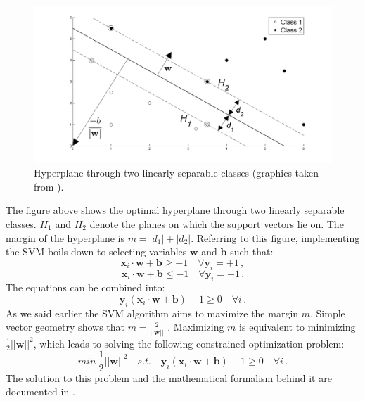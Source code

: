 \documentclass[a4paper,11pt,oneside]{article}
\begin{document}
\begin{figure}[H]
  \includegraphics[scale=0.3]{hyperplane}
  \centering
  \caption{Hyperplane through two linearly separable classes (graphics taken from \cite{fletcher2009support}).}
\end{figure}
The figure above shows the optimal hyperplane through two linearly separable classes. 
$H_1$ and $H_2$ denote the planes on which the support vectors lie on. 
The margin of the hyperplane is $m = |d_1|+|d_2|$. Referring to this figure, implementing the SVM boils down to selecting
variables $\mathbf{w}$ and $\mathbf{b}$ such that:
\begin{equation}\label{svm1}
  \mathbf{x}_i\cdot\mathbf{w}+\mathbf{b}\geq +1 \quad \forall \mathbf{y}_i = +1\,,
\end{equation}
\begin{equation}\label{svm2}
  \mathbf{x}_i\cdot\mathbf{w}+\mathbf{b}\leq -1 \quad \forall \mathbf{y}_i = -1\,.
\end{equation}
The equations can be combined into:
\begin{equation}\label{svm3}
  \mathbf{y}_i(\mathbf{x}_i\cdot\mathbf{w}+\mathbf{b}) - 1 \geq 0 \quad \forall i\,.
\end{equation}
As we said earlier the SVM algorithm aims to maximize the margin $m$. Simple vector geometry
shows that $m = \frac{2}{||\mathbf{w}||}$ \cite{fletcher2009support}. Maximizing $m$ is equivalent to minimizing
$\frac{1}{2}||\mathbf{w}||^2$, which leads to solving the following constrained optimization problem:
\begin{equation}\label{primal}
  min \ \frac{1}{2}||\mathbf{w}||^2 \quad s.t. \quad  \mathbf{y}_i(\mathbf{x}_i\cdot\mathbf{w}+\mathbf{b}) - 1 \geq 0 \quad \forall i\,.
\end{equation}
The solution to this problem and the mathematical formalism behind it are documented in \cite{law2006simple}.
\end{document}

